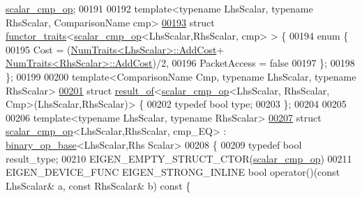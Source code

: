 \begin{DoxyCode}
      \hyperlink{struct_eigen_1_1internal_1_1scalar__cmp__op}{scalar\_cmp\_op};
00191 
00192 \textcolor{keyword}{template}<\textcolor{keyword}{typename} LhsScalar, \textcolor{keyword}{typename} RhsScalar, ComparisonName cmp>
\hyperlink{struct_eigen_1_1internal_1_1functor__traits_3_01scalar__cmp__op_3_01_lhs_scalar_00_01_rhs_scalar_00_01cmp_01_4_01_4}{00193} \textcolor{keyword}{struct }\hyperlink{struct_eigen_1_1internal_1_1functor__traits}{functor\_traits}<\hyperlink{struct_eigen_1_1internal_1_1scalar__cmp__op}{scalar\_cmp\_op}<LhsScalar,RhsScalar, cmp> > \{
00194   \textcolor{keyword}{enum} \{
00195     Cost = (\hyperlink{group___core___module_struct_eigen_1_1_num_traits}{NumTraits<LhsScalar>::AddCost}+
      \hyperlink{group___core___module_struct_eigen_1_1_num_traits}{NumTraits<RhsScalar>::AddCost})/2,
00196     PacketAccess = \textcolor{keyword}{false}
00197   \};
00198 \};
00199 
00200 \textcolor{keyword}{template}<ComparisonName Cmp, \textcolor{keyword}{typename} LhsScalar, \textcolor{keyword}{typename} RhsScalar>
\hyperlink{struct_eigen_1_1internal_1_1result__of_3_01scalar__cmp__op_3_01_lhs_scalar_00_01_rhs_scalar_00_09c9877449c1099527f34eb0a0f299607}{00201} \textcolor{keyword}{struct }\hyperlink{struct_eigen_1_1internal_1_1result__of}{result\_of}<\hyperlink{struct_eigen_1_1internal_1_1scalar__cmp__op}{scalar\_cmp\_op}<LhsScalar, RhsScalar, Cmp>(LhsScalar,RhsScalar)> \{
00202   \textcolor{keyword}{typedef} \textcolor{keywordtype}{bool} type;
00203 \};
00204 
00205 
00206 \textcolor{keyword}{template}<\textcolor{keyword}{typename} LhsScalar, \textcolor{keyword}{typename} RhsScalar>
\hyperlink{struct_eigen_1_1internal_1_1scalar__cmp__op_3_01_lhs_scalar_00_01_rhs_scalar_00_01cmp___e_q_01_4}{00207} \textcolor{keyword}{struct }\hyperlink{struct_eigen_1_1internal_1_1scalar__cmp__op}{scalar\_cmp\_op}<LhsScalar,RhsScalar, cmp\_EQ> : \hyperlink{struct_eigen_1_1internal_1_1binary__op__base}{binary\_op\_base}<LhsScalar,Rhs
      Scalar>
00208 \{
00209   \textcolor{keyword}{typedef} \textcolor{keywordtype}{bool} result\_type;
00210   EIGEN\_EMPTY\_STRUCT\_CTOR(\hyperlink{struct_eigen_1_1internal_1_1scalar__cmp__op}{scalar\_cmp\_op})
00211   EIGEN\_DEVICE\_FUNC EIGEN\_STRONG\_INLINE \textcolor{keywordtype}{bool} operator()(\textcolor{keyword}{const} LhsScalar& a, \textcolor{keyword}{const} RhsScalar& b)\textcolor{keyword}{ const }\{\textcolor{keywordflow}{
}
\end{DoxyCode}
